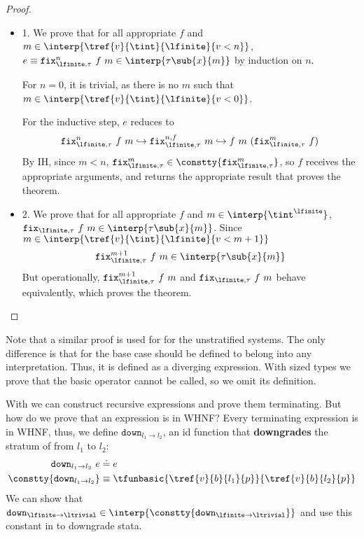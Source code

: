 \begin{proof}
\begin{itemize}
\item 1.
We prove that for all
appropriate $f$
and $ m \in \interp{\tref{v}{\tint}{\lfinite}{v < n}}$,
$e \equiv \etfixn{\tau}{f}{n}\ f \ m \in \interp{\tau\sub{x}{m}}$
% 
by induction on $n$.

For $n=0$, 
it is trivial, as 
there is no $m$ such that
$m \in \interp{\tref{v}{\tint}{\lfinite}{v < 0}}$.

For the inductive step, $e$ reduces to 
$$
\etfixn{\tau}{f}{n}\ f\ m 
\hookrightarrow
\etfixfn{\tau}{f}{n}\ m 
\hookrightarrow
f\ m\ (\etfixn{\tau}{f}{m}\ f)\\
$$
By IH, since $m < n$,
$\etfixn{\tau}{f}{m} \in \constty{\etfixn{\tau}{f}{m}}$, 
so $f$ receives the appropriate arguments, 
and returns the appropriate result that proves the theorem.
%
\item 2.
We prove that 
for all appropriate $f$
and     $ m \in \interp{\tint^\lfinite}$,
$\etfix{\tau}\ f \ m \in \interp{\tau\sub{x}{m}}$.
%
Since $m \in \interp{\tref{v}{\tint}{\lfinite}{v < m+1}}$
$$\etfixn{\tau}{f}{m+1}\ f \ m \in \interp{\tau\sub{x}{m}}$$
%
But operationally, 
$\etfixn{\tau}{f}{m+1}\ f \ m$
and
$\etfix{\tau}\ f \ m$
behave equivalently, which proves the theorem.
\end{itemize}
\end{proof}

Note that a similar proof is used for \efix{\tau}
for the unstratified systems.
%
The only difference is that for the base case
 should be defined to belong 
into any interpretation.
Thus, it is defined as a diverging expression.
%
With sized types we prove that the basic
 operator
cannot be called, so we omit its definition.

%
With \etfix{\tau} we can construct recursive expressions
and prove them terminating.
%
But how do we prove that an expression is in WHNF?
%
\newcommand\edown[2]{\ensuremath{\mathtt{down}_{#1 \rightarrow #2}}}
Every terminating expression is in WHNF, 
thus, we define \edown{l_1}{l_2}, an id function that 
\textbf{downgrades} the stratum of from $l_1$ to $l_2$:
%
\begin{align*}
\edown{l_1}{l_2} \ e &\doteq e\\
\constty{\edown{l_1}{l_2}} & \equiv 
\tfunbasic{\tref{v}{b}{l_1}{p}}{\tref{v}{b}{l_2}{p}}
\end{align*}
We can show that $\edown{\lfinite}{\ltrivial} 
\in \interp{\constty{\edown{\lfinite}{\ltrivial}}}$
and use this constant in \undeclang to downgrade stata.
